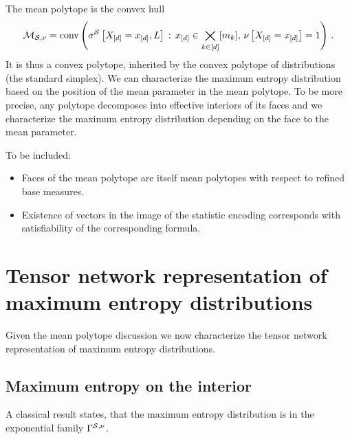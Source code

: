 \documentclass[aps,onecolumn,nofootinbib,pra]{article}
\begin{document}
    \begin{center}
        
    \end{center}


    The mean polytope is the convex hull
    \begin{align*}
        \mathcal{M}_{\mathcal{S},\nu}
        = \mathrm{conv}\left(\sigma^{\mathcal{S}}\left[X_{[d]}=x_{[d]},L\right]\,:\,x_{[d]}\in\bigtimes_{k\in[d]}[m_{k}],\,\nu\left[X_{[d]}=x_{[d]}\right]=1\right) \, .
    \end{align*}
    It is thus a convex polytope, inherited by the convex polytope of distributions (the standard simplex).
    We can characterize the maximum entropy distribution based on the position of the mean parameter in the mean polytope.
    To be more precise, any polytope decomposes into effective interiors of its faces and we characterize the maximum entropy distribution depending on the face to the mean parameter.

    To be included:
    \begin{itemize}
        \item Faces of the mean polytope are itself mean polytopes with respect to refined base measures.
        \item Existence of vectors in the image of the statistic encoding corresponds with satisfiability of the corresponding formula.
    \end{itemize}


    \section{Tensor network representation of maximum entropy distributions}

    Given the mean polytope discussion we now characterize the tensor network representation of maximum entropy distributions.

    \subsection{Maximum entropy on the interior}

    A classical result states, that the maximum entropy distribution is in the exponential family $\Gamma^{\mathcal{S},\nu}$.
\end{document}
